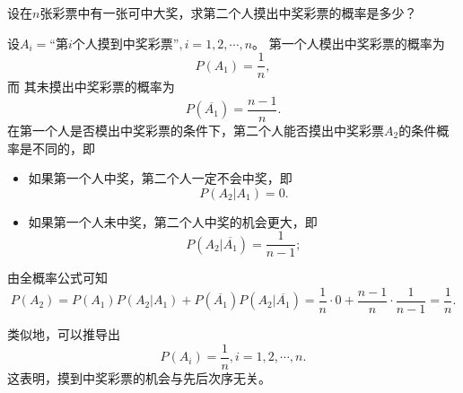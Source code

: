 \begin{example}[（摸彩模型）]
    设在$n$张彩票中有一张可中大奖，求第二个人摸出中奖彩票的概率是多少？
\end{example}
\begin{solution}
设$A_{i}=${“第$i$个人摸到中奖彩票”}$,i=1,2,\cdots,n$。
第一个人模出中奖彩票的概率为$$P(A_1) = \frac{1}{n},$$而
其未摸出中奖彩票的概率为$$P(\overline{A_{1}  } )=\frac{n-1}{n}.$$
在第一个人是否模出中奖彩票的条件下，第二个人能否摸出中奖彩票$A_{2}$的条件概率是不同的，即
\begin{itemize}
\item 如果第一个人中奖，第二个人一定不会中奖，即$$P(A_{2} |A_{1} )=0.$$
\item 如果第一个人未中奖，第二个人中奖的机会更大，即$$P(A_{2} |\overline{A_{1} } )=\frac{1}{n-1} ;$$
\end{itemize}
由全概率公式可知$$P(A_{2})=P(A_{1}  )P(A_{2}| A_{1} )+P(\overline{A_{1}  } )P(A_{2}| \overline{A_{1}}  )=\frac{1}{n} \cdot 0+\frac{n-1}{n}\cdot\frac{1}{n-1}=\frac{1}{n} .$$
\end{solution}

\begin{remark}
    类似地，可以推导出$$P(A_{i})=\frac{1}{n} ,i=1,2,\cdots ,n.$$
    这表明，摸到中奖彩票的机会与先后次序无关。
\end{remark}

